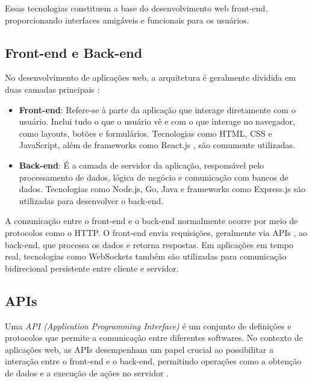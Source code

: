 Essas tecnologias constituem a base do desenvolvimento web front-end, proporcionando interfaces amigáveis e funcionais para os usuários.

\subsection{Front-end e Back-end}


No desenvolvimento de aplicações web, a arquitetura é geralmente dividida em duas camadas principais \cite{web-app}:

\begin{itemize}
    \item \textbf{Front-end}: Refere-se à parte da aplicação que interage diretamente com o usuário. Inclui tudo o que o usuário vê e com o que interage no navegador, como layouts, botões e formulários. Tecnologias como HTML, CSS e JavaScript, além de frameworks como React.js \cite{react-js}, são comumente utilizadas.
    \item \textbf{Back-end}: É a camada de servidor da aplicação, responsável pelo processamento de dados, lógica de negócio e comunicação com bancos de dados. Tecnologias como Node.js, Go, Java e frameworks como Express.js são utilizadas para desenvolver o back-end.
\end{itemize}

A comunicação entre o front-end e o back-end normalmente ocorre por meio de protocolos como o HTTP. O front-end envia requisições, geralmente via APIs \cite{web-app}, ao back-end, que processa os dados e retorna respostas. Em aplicações em tempo real, tecnologias como WebSockets também são utilizadas para comunicação bidirecional \cite{ws-standard} persistente entre cliente e servidor.

\subsection{APIs}


Uma \emph{API (Application Programming Interface)} é um conjunto de definições e protocolos que permite a comunicação entre diferentes softwares. No contexto de aplicações web, as APIs desempenham um papel crucial ao possibilitar a interação entre o front-end e o back-end, permitindo operações como a obtenção de dados e a execução de ações no servidor \cite{aws-api-types}.

